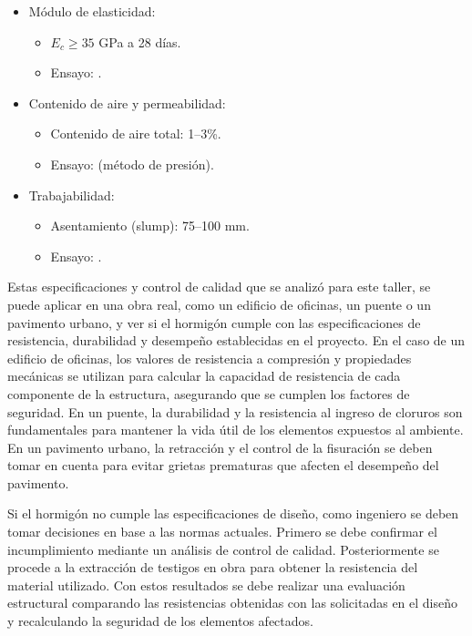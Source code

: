 \begin{itemize}
    \item Módulo de elasticidad:
    \begin{itemize}
        \item $E_c \geq 35$ GPa a 28 días.
        \item Ensayo: \citep{ASTM_C469_2002}.
    \end{itemize}

    \item Contenido de aire y permeabilidad:
    \begin{itemize}
        \item Contenido de aire total: 1–3\%.
        \item Ensayo: \citep{ASTM_C231_2014} (método de presión).
    \end{itemize}

    \item Trabajabilidad:
    \begin{itemize}
        \item Asentamiento (slump): 75–100 mm.
        \item Ensayo: \citep{NCh1019_Of2009}.
    \end{itemize}
\end{itemize}


Estas especificaciones y control de calidad que se analizó para este taller, se puede aplicar en una obra real, como un edificio de oficinas, un puente o un pavimento urbano, y ver si el hormigón cumple con las especificaciones de resistencia, durabilidad y desempeño establecidas en el proyecto. En el caso de un edificio de oficinas, los valores de resistencia a compresión y propiedades mecánicas se utilizan para calcular la capacidad de resistencia de cada componente de la estructura, asegurando que se cumplen los factores de seguridad. En un puente, la durabilidad y la resistencia al ingreso de cloruros son fundamentales para mantener la vida útil de los elementos expuestos al ambiente. En un pavimento urbano, la retracción y el control de la fisuración se deben tomar en cuenta para evitar grietas prematuras que afecten el desempeño del pavimento.

Si el hormigón no cumple las especificaciones de diseño, como ingeniero  se deben tomar decisiones en base a las normas actuales. Primero se debe confirmar el incumplimiento mediante un análisis de control de calidad. Posteriormente se procede a la extracción de testigos en obra para obtener la resistencia del material utilizado. Con estos resultados se debe realizar una evaluación estructural comparando las resistencias obtenidas con las solicitadas en el diseño y recalculando la seguridad de los elementos afectados.

